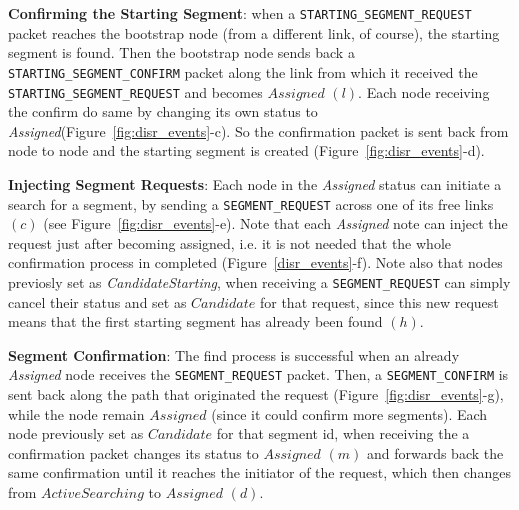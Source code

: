 \begin{itemize}
\item{\textbf{Confirming the Starting Segment}}: when a \texttt{STARTING\_SEGMENT\_REQUEST} packet reaches
the bootstrap node (from a different link, of course), the starting
segment is found. Then the bootstrap node sends back a \texttt{STARTING\_SEGMENT\_CONFIRM}
packet along the link from which it received the
\texttt{STARTING\_SEGMENT\_REQUEST} and becomes $Assigned$ $(l)$. Each
node receiving the confirm do same by changing its own status
to \emph{Assigned}(Figure~\ref{fig:disr_events}-c). So the confirmation packet is sent back from
node to node and the starting segment is created (Figure~\ref{fig:disr_events}-d). 




\item{\textbf{Injecting Segment Requests}: Each node in the
\emph{Assigned} status can initiate a search for a segment, by sending
a \texttt{SEGMENT\_REQUEST} across one of its free links $(c)$ (see
Figure~\ref{fig:disr_events}-e). 
Note that each \emph{Assigned} note can inject the request just after
becoming assigned, i.e. it is not needed that the whole confirmation
process in completed (Figure~\ref{disr_events}-f).
Note also that nodes previosly set as \emph{CandidateStarting}, when receiving 
a \texttt{SEGMENT\_REQUEST} can simply cancel their
status and set as $Candidate$ for that request, since this new
request means that the first starting segment has already been found $(h)$. 
\item{\textbf{Segment Confirmation}}: The find process is successful
when an already \emph{Assigned} node receives the
\texttt{SEGMENT\_REQUEST} packet. Then, a \texttt{SEGMENT\_CONFIRM} is
sent back along the path that originated the request
(Figure~\ref{fig:disr_events}-g), while the
node remain $Assigned$ (since it could confirm more segments). Each node
previously set as $Candidate$ for that segment id, when receiving the
a confirmation packet changes its status to $Assigned$ $(m)$ and forwards back
the same confirmation until it reaches the initiator of the request,
which then changes from $ActiveSearching$ to $Assigned$ $(d)$.

}
\end{itemize}
